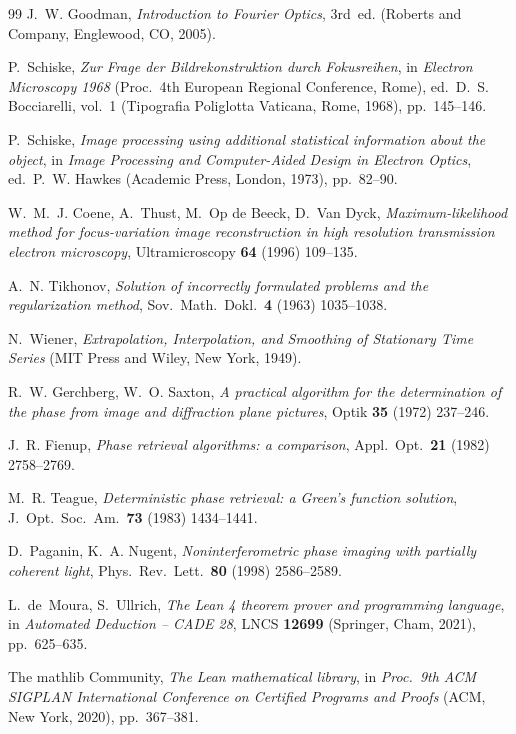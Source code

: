 \documentclass[11pt,a4paper]{article}
\theoremstyle{definition}
\theoremstyle{remark}
\begin{document}
\begin{thebibliography}{99}
J.~W. Goodman,
\emph{Introduction to Fourier Optics}, 3rd~ed.
(Roberts and Company, Englewood, CO, 2005).

P.~Schiske,
\emph{Zur Frage der Bildrekonstruktion durch Fokusreihen},
in \emph{Electron Microscopy 1968} (Proc.\ 4th European Regional
Conference, Rome), ed.\ D.~S. Bocciarelli, vol.~1
(Tipografia Poliglotta Vaticana, Rome, 1968), pp.~145--146.

P.~Schiske,
\emph{Image processing using additional statistical information
about the object},
in \emph{Image Processing and Computer-Aided Design in Electron
Optics}, ed.\ P.~W. Hawkes (Academic Press, London, 1973), pp.~82--90.

W.~M.~J. Coene, A.~Thust, M.~Op de Beeck, D.~Van Dyck,
\emph{Maximum-likelihood method for focus-variation image
reconstruction in high resolution transmission electron microscopy},
Ultramicroscopy \textbf{64} (1996) 109--135.

A.~N. Tikhonov,
\emph{Solution of incorrectly formulated problems and the
regularization method},
Sov.\ Math.\ Dokl.\ \textbf{4} (1963) 1035--1038.

N.~Wiener,
\emph{Extrapolation, Interpolation, and Smoothing of Stationary
Time Series}
(MIT Press and Wiley, New York, 1949).

R.~W. Gerchberg, W.~O. Saxton,
\emph{A practical algorithm for the determination of the phase
from image and diffraction plane pictures},
Optik \textbf{35} (1972) 237--246.

J.~R. Fienup,
\emph{Phase retrieval algorithms: a comparison},
Appl.\ Opt.\ \textbf{21} (1982) 2758--2769.

M.~R. Teague,
\emph{Deterministic phase retrieval: a Green's function solution},
J.\ Opt.\ Soc.\ Am.\ \textbf{73} (1983) 1434--1441.

D.~Paganin, K.~A. Nugent,
\emph{Noninterferometric phase imaging with partially coherent light},
Phys.\ Rev.\ Lett.\ \textbf{80} (1998) 2586--2589.

L.~de~Moura, S.~Ullrich,
\emph{The Lean 4 theorem prover and programming language},
in \emph{Automated Deduction -- CADE 28},
LNCS \textbf{12699} (Springer, Cham, 2021), pp.~625--635.

The mathlib Community,
\emph{The Lean mathematical library},
in \emph{Proc.\ 9th ACM SIGPLAN International Conference on
Certified Programs and Proofs} (ACM, New York, 2020), pp.~367--381.


\end{thebibliography}
\end{document}
